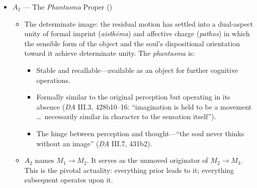 \begin{itemize}
      \item $A_2$ --- The \textit{Phantasma} Proper ()
      \begin{itemize}
          \item The determinate image: the residual motion has settled into a
          dual-aspect unity of formal imprint (\textit{aisthēma}) and affective
          charge (\textit{pathos}) in which the sensible form of the object and the
          soul's dispositional orientation toward it achieve determinate unity.
          The \textit{phantasma} is:
          \begin{itemize}
              \item Stable and recallable---available as an object for further
              cognitive operations.
              \item Formally similar to the original perception but operating in its
              absence (\textit{DA} III.3, 428b10--16: ``imagination is held to be a
              movement \ldots\ necessarily similar in character to the sensation
              itself'').
              \item The hinge between perception and thought---``the soul never
              thinks without an image'' (\textit{DA} III.7, 431b2).
          \end{itemize}
          \item $A_2$ names $M_1 \rightarrow M_2$. It serves as the unmoved originator of
          $M_2 \rightarrow M_3$. This is the pivotal actuality: everything prior
          leads to it; everything subsequent operates upon it.


\end{itemize}
\end{itemize}
